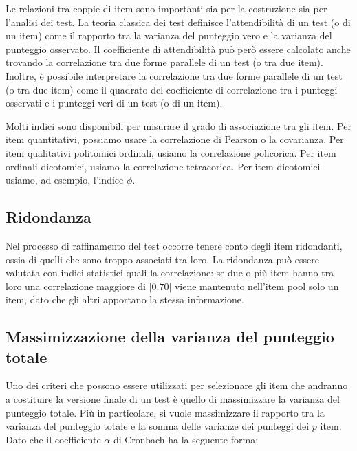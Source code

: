 \documentclass[
  11pt,
]{krantz}
\theoremstyle{definition}
\theoremstyle{definition}
\theoremstyle{definition}
\theoremstyle{definition}
\theoremstyle{remark}
\begin{document}
Le relazioni tra coppie di item sono importanti sia per la costruzione sia per l'analisi dei test. La teoria classica dei test definisce l'attendibilità di un test (o di un item) come il rapporto tra la varianza del punteggio vero e la varianza del punteggio osservato. Il coefficiente di attendibilità può però essere calcolato anche trovando la correlazione tra due forme parallele di un test (o tra due item). Inoltre, è possibile interpretare la correlazione tra due forme parallele di un test (o tra due item) come il quadrato del coefficiente di correlazione tra i punteggi osservati e i punteggi veri di un test (o di un item).

Molti indici sono disponibili per misurare il grado di associazione tra gli item. Per item quantitativi, possiamo usare la correlazione di Pearson o la covarianza. Per item qualitativi politomici ordinali, usiamo la correlazione policorica. Per item ordinali dicotomici, usiamo la correlazione tetracorica. Per item dicotomici usiamo, ad esempio, l'indice \(\phi\).

\hypertarget{ridondanza}{%
\subsection{Ridondanza}\label{ridondanza}}

Nel processo di raffinamento del test occorre tenere conto degli item ridondanti, ossia di quelli che sono troppo associati tra loro. La ridondanza può essere valutata con indici statistici quali la correlazione: se due o più item hanno tra loro una correlazione maggiore di \(|0.70|\) viene mantenuto nell'item pool solo un item, dato che gli altri apportano la stessa informazione.

\hypertarget{massimizzazione-della-varianza-del-punteggio-totale}{%
\subsection{Massimizzazione della varianza del punteggio totale}\label{massimizzazione-della-varianza-del-punteggio-totale}}

Uno dei criteri che possono essere utilizzati per selezionare gli item che andranno a costituire la versione finale di un test è quello di massimizzare la varianza del punteggio totale. Più in particolare, si vuole massimizzare il rapporto tra la varianza del punteggio totale e la somma delle varianze dei punteggi dei \(p\) item. Dato che il coefficiente \(\alpha\) di Cronbach ha la seguente forma:
\end{document}

